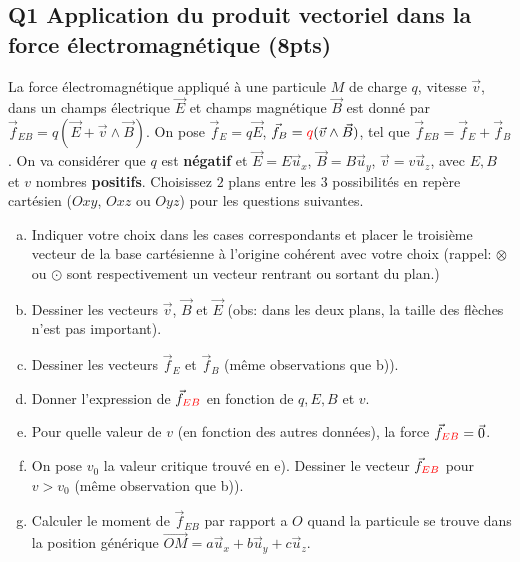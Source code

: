 \documentclass[french,10pt,twocolumn]{article}
\begin{document}
	\FloatBarrier
	
	\subsection*{Q1 Application du produit vectoriel dans la force électromagnétique (8pts)}
	La force électromagnétique appliqué à une particule $M$ de charge $q$, vitesse $\vec{v}$, dans un champs électrique $\vec{E}$ et champs magnétique $\vec{B}$ est donné par $\vec{f}_{EB} = q (\vec{E} + \vec{v} \wedge \vec{B})$. On pose $\vec{f}_E = q \vec{E}$, $\vec{f}_B = { \color{red} q } (\vec{v} \wedge \vec{B})$, tel que $\vec{f}_{EB} = \vec{f}_E + \vec{f}_B$. On va considérer que $q$ est \textbf{négatif} et $\vec{E} = E \vec{u}_x$, $\vec{B} = B \vec{u}_y$, $\vec{v} = v \vec{u}_z$, avec $E, B$ et $v$ nombres \textbf{positifs}. Choisissez $2$ plans entre les $3$ possibilités en repère cartésien ($Oxy$, $Oxz$ ou $Oyz$) pour les questions suivantes. 
	\begin{enumerate}[a)]
		\item Indiquer votre choix dans les cases correspondants et placer le troisième vecteur de la base cartésienne à l'origine cohérent avec votre choix (rappel: $\otimes$ ou $\odot$  sont respectivement un vecteur rentrant ou sortant du plan.) 
		\item Dessiner les vecteurs $\vec{v}$, $\vec{B}$ et $\vec{E}$ (obs: dans les deux plans, la taille des flèches n'est pas important).
		\item Dessiner les vecteurs $\vec{f}_E$ et $\vec{f}_B$ (même observations que b)). 
		\item Donner l'expression de $\vec{f}_{\color{red} 	EB}$ en fonction de $q, E, B$ et $v$.
		\item Pour quelle valeur de $v$ (en fonction des autres données), la force $\vec{f}_{\color{red} EB} = \vec{0}$.
		\item On pose $v_0$ la valeur critique trouvé en e). Dessiner le vecteur $\vec{f}_{\color{red} EB}$ pour $v>v_0$ (même observation que b)).
		\item Calculer le moment de $\vec{f}_{EB}$ par rapport a $O$ quand la particule se trouve dans la position générique $\vec{OM} = a\vec{u}_x + b\vec{u}_y + c\vec{u}_z$.
	\end{enumerate}
	



	\vspace{-1cm}	
	\FloatBarrier
	\vspace{-1cm}
\end{document}
